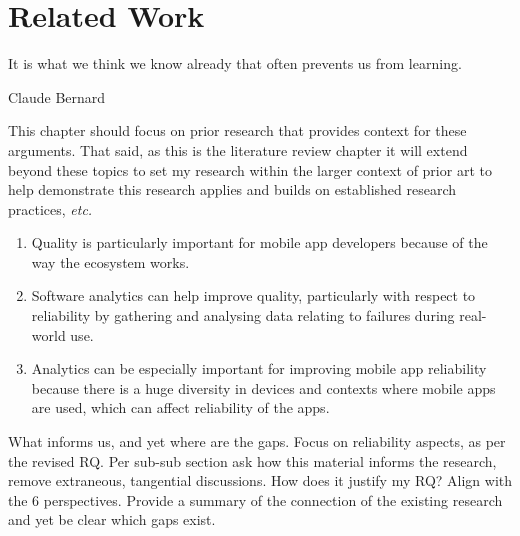 \setchapterpreamble[u]{\margintoc}
\chapter{Related Work}
\label{chapter-related-work}
\epigraph{It is what we think we know already that often prevents us from learning.}{Claude Bernard} %


\bigskip
\bigskip %

\begin{kaobox}[frametitle=Context for this chapter]
This chapter should focus on prior research that provides context for these arguments. That said, as this is the literature review chapter it will extend beyond these topics to set my research within the larger context of prior art to help demonstrate this research applies and builds on established research practices, \emph{etc.}

\begin{enumerate}[start=3]
    \item Quality is particularly important for mobile app developers because of the way the ecosystem works.
    \item Software analytics can help improve quality, particularly with respect to reliability by gathering and analysing data relating to failures during real-world use.
    \item Analytics can be especially important for improving mobile app reliability because there is a huge diversity in devices and contexts where mobile apps are used, which can affect reliability of the apps.
\end{enumerate}

What informs us, and yet where are the gaps. Focus on reliability aspects, as per the revised RQ. Per sub-sub section ask how this material informs the research, remove extraneous, tangential discussions. How does it justify my RQ? Align with the 6 perspectives. Provide a summary of the connection of the existing research and yet be clear which gaps exist. 

\end{kaobox}



